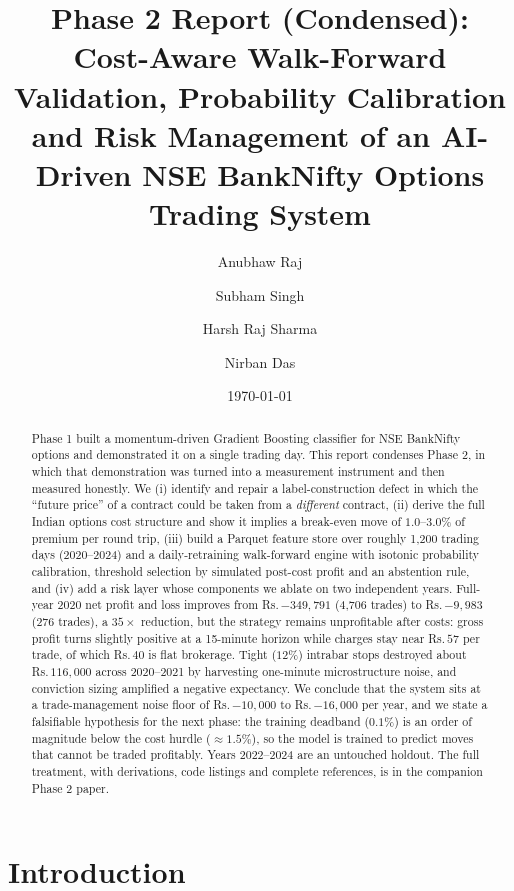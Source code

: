 \documentclass[10pt,a4paper]{article}
\title{\vspace{-8mm}\textbf{Phase 2 Report (Condensed):\\
Cost-Aware Walk-Forward Validation, Probability Calibration and Risk
Management of an AI-Driven NSE BankNifty Options Trading System}}
\author{Anubhaw Raj \and Subham Singh \and Harsh Raj Sharma \and Nirban Das}
\date{\today}
\newcommand{\rs}{Rs.\,}
\begin{document}
\maketitle
\vspace{-6mm}

\begin{abstract}
\small
Phase 1 built a momentum-driven Gradient Boosting classifier for NSE BankNifty
options and demonstrated it on a single trading day. This report condenses
Phase 2, in which that demonstration was turned into a measurement instrument
and then measured honestly. We (i) identify and repair a label-construction
defect in which the ``future price'' of a contract could be taken from a
\emph{different} contract, (ii) derive the full Indian options cost structure
and show it implies a break-even move of $1.0$--$3.0\%$ of premium per round
trip, (iii) build a Parquet feature store over roughly 1{,}200 trading days
(2020--2024) and a daily-retraining walk-forward engine with isotonic
probability calibration, threshold selection by simulated post-cost profit and
an abstention rule, and (iv) add a risk layer whose components we ablate on two
independent years. Full-year 2020 net profit and loss improves from
\rs$-349{,}791$ (4{,}706 trades) to \rs$-9{,}983$ (276 trades), a $35\times$
reduction, but the strategy remains unprofitable after costs: gross profit
turns slightly positive at a 15-minute horizon while charges stay near
\rs$57$ per trade, of which \rs$40$ is flat brokerage. Tight ($12\%$) intrabar
stops destroyed about \rs$116{,}000$ across 2020--2021 by harvesting
one-minute microstructure noise, and conviction sizing amplified a negative
expectancy. We conclude that the system sits at a trade-management noise floor
of \rs$-10{,}000$ to \rs$-16{,}000$ per year, and we state a falsifiable
hypothesis for the next phase: the training deadband ($0.1\%$) is an order of
magnitude below the cost hurdle ($\approx 1.5\%$), so the model is trained to
predict moves that cannot be traded profitably. Years 2022--2024 are an
untouched holdout. The full treatment, with derivations, code listings and
complete references, is in the companion Phase 2 paper.
\end{abstract}

\vspace{3mm}
\setcounter{tocdepth}{1}
\renewcommand{\contentsname}{\normalsize Contents}
{\small \tableofcontents}
\newpage

\section{Introduction}
\end{document}
